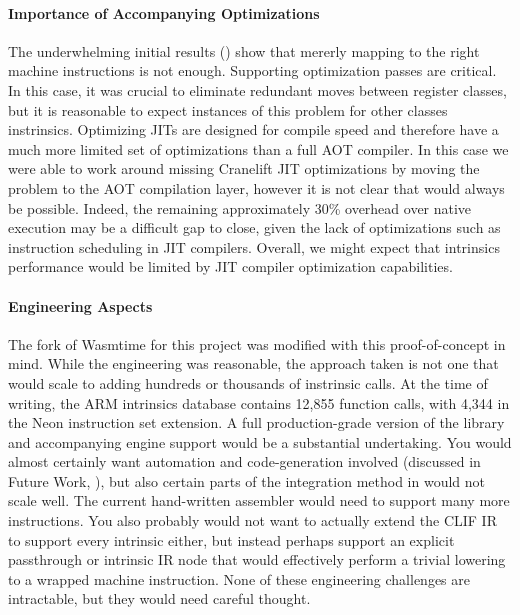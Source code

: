 \paragraph{Importance of Accompanying Optimizations}

The underwhelming initial results () show that mererly
mapping to the right machine instructions is not enough. Supporting optimization
passes are critical. In this case, it was crucial to eliminate redundant moves
between register classes, but it is reasonable to expect instances of this
problem for other classes instrinsics. Optimizing JITs are designed for compile
speed and therefore have a much more limited set of optimizations than a full
AOT compiler. In this case we were able to work around missing Cranelift JIT
optimizations by moving the problem to the AOT compilation layer, however it is
not clear that would always be possible. Indeed, the remaining approximately
30\% overhead over native execution may be a difficult gap to close, given the
lack of optimizations such as instruction scheduling in JIT compilers. Overall,
we might expect that \wasm intrinsics performance would be limited by JIT
compiler optimization capabilities.

\paragraph{Engineering Aspects}

The fork of Wasmtime for this project was modified with this proof-of-concept in
mind. While the engineering was reasonable, the approach taken is not one that
would scale to adding hundreds or thousands of instrinsic calls. At the time of
writing, the ARM intrinsics database contains 12,855 function calls, with 4,344
in the Neon instruction set extension. A full production-grade version of the
 library and accompanying engine support would be a
substantial undertaking. You would almost certainly want automation and
code-generation involved (discussed in Future Work, ), but also
certain parts of the integration method in  would not scale well.
The current hand-written assembler would need to support many more instructions.
You also probably would not want to actually extend the CLIF IR to support every
intrinsic either, but instead perhaps support an explicit passthrough or
intrinsic IR node that would effectively perform a trivial lowering to a wrapped
machine instruction. None of these engineering challenges are intractable, but
they would need careful thought.
